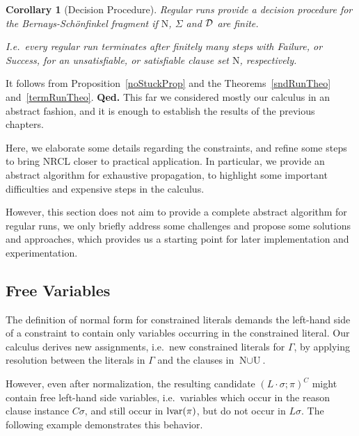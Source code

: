 \documentclass[a4paper]{article}
\newcommand{\mEPR}{Bernays-Sch\"onfinkel}
\newcommand{\startproof}{{\bf Proof:~}}
\newcommand{\finishproof}{{\bf Qed.}}
\newtheorem{coro}[defi]{Corollary}
\begin{document}
\begin{coro}[Decision Procedure]Regular runs provide a decision procedure for the {\mEPR} fragment if $\text{N}$, $\Sigma$ and $\mathcal{D}$ are finite.

I.e.\ every regular run terminates after finitely many steps with \emph{Failure}, or \emph{Success}, for an unsatisfiable, or satisfiable 
clause set $\text{N}$, respectively.
\end{coro}
\noindent\startproof It follows from Proposition~\ref{noStuckProp} and the Theorems~\ref{sndRunTheo} and~\ref{termRunTheo}.
\finishproof
This far we considered mostly our calculus in an abstract fashion, and it is enough to establish 
the results of the previous chapters.

Here, we elaborate some details regarding the constraints, 
and refine some steps to bring NRCL closer to practical application. 
In particular, we provide an abstract algorithm for exhaustive propagation, 
to highlight some important difficulties and expensive steps in the calculus.

However, this section does not aim to provide a complete abstract algorithm for regular runs, we 
only briefly address some challenges and propose some solutions and approaches, 
which provides us a starting point for later implementation and experimentation.
\subsection{Free Variables}
\newcommand\restr[2]{\ensuremath{\left.#1\right|_{#2}}}
The definition of normal form for constrained literals demands the left-hand side of a constraint to contain only variables 
occurring in the constrained literal. 
Our calculus derives new assignments, i.e.\ new constrained literals for $\Gamma$, by applying 
resolution between the literals in $\Gamma$ and the clauses in $\text{N} \cup \text{U}$. 

However, even after normalization, the resulting candidate $(L\cdot\sigma; \pi)^C$ might contain
free left-hand side variables, i.e.\ variables which occur in the reason clause instance $C\sigma$, 
and still occur in $\operatorname{lvar}(\pi)$, 
but do not occur in $L\sigma$. 
The following example demonstrates this behavior.
\end{document}
